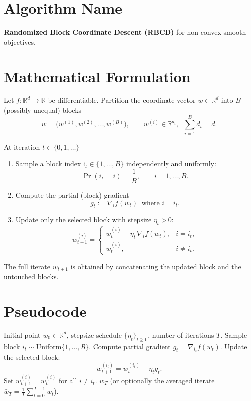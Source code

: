 \documentclass{article}
\newcommand{\R}{\mathbb{R}}
\newcommand{\grad}{\nabla}
\begin{document}
\section*{Algorithm Name}
\textbf{Randomized Block Coordinate Descent (RBCD)} for non‑convex smooth objectives.

\section*{Mathematical Formulation}
Let $f:\R^{d}\rightarrow\R$ be differentiable.  
Partition the coordinate vector $w\in\R^{d}$ into $B$ (possibly unequal) blocks
\[
w=\bigl(w^{(1)},w^{(2)},\dots ,w^{(B)}\bigr),\qquad 
w^{(i)}\in\R^{d_i},\;\; \sum_{i=1}^{B}d_i=d .
\]

At iteration $t\in\{0,1,\dots\}$

\begin{enumerate}[label=\arabic*)]
\item Sample a block index $i_t\in\{1,\dots ,B\}$ independently and uniformly:
\[
\Pr(i_t=i)=\frac1B,\qquad i=1,\dots ,B .
\]
\item Compute the partial (block) gradient
\[
g_t:=\grad_i f(w_t)\;\; \text{where } i=i_t .
\]
\item Update only the selected block with stepsize $\eta_t>0$:
\[
w_{t+1}^{(i)}=
\begin{cases}
w_{t}^{(i)}-\eta_t\,\grad_i f(w_t), & i=i_t,\\[4pt]
w_{t}^{(i)}, & i\neq i_t .
\end{cases}
\tag{1}
\]
\end{enumerate}

The full iterate $w_{t+1}$ is obtained by concatenating the updated block
and the untouched blocks.

\section*{Pseudocode}
\begin{algorithm}[H]
\caption{Randomized Block Coordinate Descent (RBCD)}
\begin{algorithmic}[1]
\REQUIRE Initial point $w_0\in\R^{d}$, stepsize schedule $\{\eta_t\}_{t\ge0}$, number of iterations $T$.
    \STATE Sample block $i_t\sim\text{Uniform}\{1,\dots ,B\}$.
    \STATE Compute partial gradient $g_t=\grad_{i_t}f(w_t)$.
    \STATE Update the selected block:
    \[
    w_{t+1}^{(i_t)} = w_t^{(i_t)}-\eta_t g_t .
    \]
    \STATE Set $w_{t+1}^{(i)} = w_t^{(i)}$ for all $i\neq i_t$.
\ENDFOR
\RETURN $w_T$ (or optionally the averaged iterate $\bar w_T=\frac1T\sum_{t=0}^{T-1}w_t$).
\end{algorithmic}
\end{algorithm}
\end{document}
